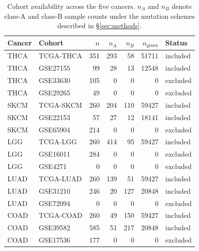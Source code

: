 \begin{table}[htbp]
\centering\small
\caption{Cohort availability across the five cancers. $n_A$ and $n_B$ denote class-A and class-B sample counts under the mutation schemes described in \S\ref{sec:methods}.}
\label{tab:cohort-availability}
\begin{tabular}{llrrrrl}\toprule
Cancer & Cohort & $n$ & $n_A$ & $n_B$ & $n_{\mathrm{genes}}$ & Status \\ \midrule
THCA & TCGA-THCA & 351 & 293 & 58 & 51711 & included \\
THCA & GSE27155 & 99 & 28 & 13 & 12548 & included \\
THCA & GSE33630 & 105 & 0 & 0 & 0 & excluded \\
THCA & GSE29265 & 49 & 0 & 0 & 0 & excluded \\
SKCM & TCGA-SKCM & 260 & 204 & 110 & 59427 & included \\
SKCM & GSE22153 & 57 & 27 & 12 & 18141 & included \\
SKCM & GSE65904 & 214 & 0 & 0 & 0 & excluded \\
LGG & TCGA-LGG & 260 & 414 & 95 & 59427 & included \\
LGG & GSE16011 & 284 & 0 & 0 & 0 & excluded \\
LGG & GSE4271 & 0 & 0 & 0 & 0 & excluded \\
LUAD & TCGA-LUAD & 260 & 139 & 51 & 59427 & included \\
LUAD & GSE31210 & 246 & 20 & 127 & 20848 & included \\
LUAD & GSE72094 & 0 & 0 & 0 & 0 & excluded \\
COAD & TCGA-COAD & 260 & 49 & 150 & 59427 & included \\
COAD & GSE39582 & 585 & 51 & 217 & 20848 & included \\
COAD & GSE17536 & 177 & 0 & 0 & 0 & excluded \\
\bottomrule
\end{tabular}
\end{table}
